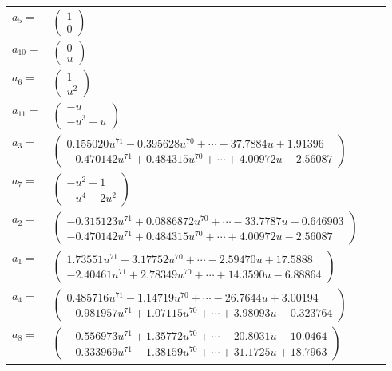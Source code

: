\documentclass[1p]{elsarticle_modified}
\theoremstyle{definition}
\begin{document}
\begin{tabular}{m{7pt} m{180pt} m{7pt} m{180pt} }
\flushright $a_{5}=$&$\begin{pmatrix}1\\0\end{pmatrix}$ \\
\flushright $a_{10}=$&$\begin{pmatrix}0\\u\end{pmatrix}$ \\
\flushright $a_{6}=$&$\begin{pmatrix}1\\u^2\end{pmatrix}$ \\
\flushright $a_{11}=$&$\begin{pmatrix}- u\\- u^3+u\end{pmatrix}$ \\
\flushright $a_{3}=$&$\begin{pmatrix}0.155020 u^{71}-0.395628 u^{70}+\cdots-37.7884 u+1.91396\\-0.470142 u^{71}+0.484315 u^{70}+\cdots+4.00972 u-2.56087\end{pmatrix}$ \\
\flushright $a_{7}=$&$\begin{pmatrix}- u^2+1\\- u^4+2 u^2\end{pmatrix}$ \\
\flushright $a_{2}=$&$\begin{pmatrix}-0.315123 u^{71}+0.0886872 u^{70}+\cdots-33.7787 u-0.646903\\-0.470142 u^{71}+0.484315 u^{70}+\cdots+4.00972 u-2.56087\end{pmatrix}$ \\
\flushright $a_{1}=$&$\begin{pmatrix}1.73551 u^{71}-3.17752 u^{70}+\cdots-2.59470 u+17.5888\\-2.40461 u^{71}+2.78349 u^{70}+\cdots+14.3590 u-6.88864\end{pmatrix}$ \\
\flushright $a_{4}=$&$\begin{pmatrix}0.485716 u^{71}-1.14719 u^{70}+\cdots-26.7644 u+3.00194\\-0.981957 u^{71}+1.07115 u^{70}+\cdots+3.98093 u-0.323764\end{pmatrix}$ \\
\flushright $a_{8}=$&$\begin{pmatrix}-0.556973 u^{71}+1.35772 u^{70}+\cdots-20.8031 u-10.0464\\-0.333969 u^{71}-1.38159 u^{70}+\cdots+31.1725 u+18.7963\end{pmatrix}$ \\

\end{tabular}
\end{document}
